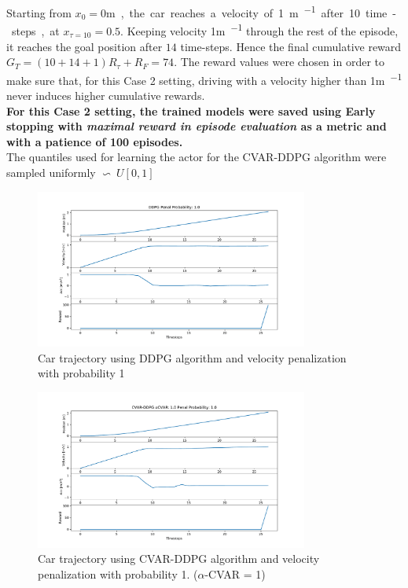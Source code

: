 Starting from $x_0=0$\si\metre, the car reaches a velocity of 1\si{\metre\per\ts} after 10 time-steps, at $x_{\tau=10}=0.5$. Keeping velocity 1\si{\metre\per\ts} through the rest of the episode, it reaches the goal position after $14$ time-steps. Hence the final cumulative reward $G_T= (10+14+1) R_{\tau} + R_{F}=74$.
The reward values were chosen in order to make sure that, for this Case 2 setting, driving with a velocity higher than 1\si{\metre\per\ts} never induces higher cumulative rewards.\\

\textbf{For this Case 2 setting, the trained models were saved using Early stopping with \textit{maximal reward in episode evaluation} as a metric and with a patience of 100 episodes.}\\
The quantiles used for learning the actor for the CVAR-DDPG algorithm were sampled uniformly $\backsim\ U[0,1] $

\begin{figure}[ht]
        \centering
        \includegraphics[width=0.8\textwidth]{images/DDPG/Trajectory_DDPG_ppenal1.pdf}
        \caption{Car trajectory using DDPG algorithm and velocity penalization with probability 1 }
        \label{traj1_ddpg_probpenal1}
    
\end{figure}


\begin{figure}[ht]
        \centering
        \includegraphics[width=0.8\textwidth]{images/CVAR/Trajectory_CVAR_ppenal1.pdf}
        \caption{Car trajectory using CVAR-DDPG algorithm and velocity penalization with probability 1. ($\alpha$-CVAR = 1)}
        \label{traj_cvarddpg_probpenal1_cvar1}
    
\end{figure}

